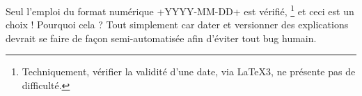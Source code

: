 \documentclass{../main/main}
\begin{document}
\begin{tdoccaut}
    Seul l'emploi du format numérique \tdoclatexin+YYYY-MM-DD+ est vérifié,%
    \footnote{
        Techniquement, vérifier la validité d'une date, via \LaTeX3, ne présente pas de difficulté.
    }
    et ceci est un choix ! Pourquoi cela ? Tout simplement car dater et versionner des explications devrait se faire de façon semi-automatisée afin d'éviter tout bug humain.
\end{tdoccaut}
\end{document}
